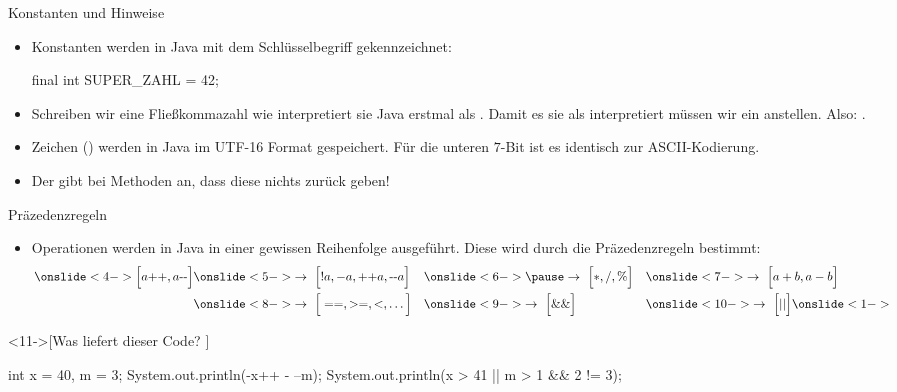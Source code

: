 \begin{frame}[fragile]{Konstanten und Hinweise}
    \begin{itemize}[<+(1)->]
        \widei
        \item Konstanten werden in Java mit dem Schlüsselbegriff  gekennzeichnet: \begin{plainjava}
final int SUPER_ZAHL = 42;
        \end{plainjava}
        \item Schreiben wir eine Fließkommazahl wie \pause{} interpretiert sie Java erstmal als .\pause{} Damit es sie als  interpretiert müssen wir ein  anstellen.\pause{} Also: .
        \item Zeichen () werden in Java im UTF-16 Format gespeichert.\pause{} Für die unteren \(7\)-Bit ist es identisch zur ASCII-Kodierung.
        \item Der   gibt bei Methoden an,\pause{} dass diese nichts zurück geben!
    \end{itemize}
\end{frame}

\begin{frame}[fragile]{Präzedenzregeln}
    \begin{itemize}[<+(1)->]
        \widei
        \item Operationen werden in Java in einer gewissen Reihenfolge ausgeführt.\pause{} Diese wird durch die Präzedenzregeln bestimmt:
        \begin{alignat*}{3}
            \onslide<4->{\Big[a\text{++},a\text{-\!\! -}\Big]}&\onslide<5->{\to~\Big[!a, -a, \text{++}a,\text{-\!\! -}a\Big]}&&\onslide<6->{\pause\to~\Big[*,/,\%\Big]} &&\onslide<7->{\to~\Big[a+b,a-b\Big]}\\
            &\onslide<8->{\to~\Big[==,>=,<,\ldots\Big]} &&\onslide<9->{\to~\Big[\&\&\Big]}&&\onslide<10->{\to~\Big[||\Big]}\onslide<1->
        \end{alignat*}
        \vspace*{-0.5cm}
    \end{itemize}
\ifull
    \begin{exercise}<11->[Was liefert dieser Code? ]
        \begin{plainjava}[columns={[c]fullflexible}]
int x = 40, m = 3;
System.out.println(-x++ - --m);
System.out.println(x > 41 || m > 1 && 2 != 3);
        \end{plainjava}
    \end{exercise}
    \fi{}
\end{frame}

